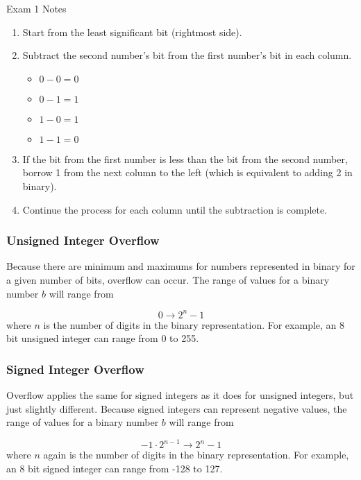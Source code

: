\begin{examnotes}{Exam 1 Notes}
    \begin{enumerate}
        \item Start from the least significant bit (rightmost side).
        \item Subtract the second number's bit from the first number's bit in each column.
        \begin{itemize}
            \item $0 - 0 = 0$
            \item $0 - 1 = 1$ 
            \item $1 - 0 = 1$
            \item $1 - 1 = 0$
        \end{itemize}
        \item If the bit from the first number is less than the bit from the second number, borrow 1 from the next column to the left (which is equivalent to adding 2 in binary).
        \item Continue the process for each column until the subtraction is complete.
    \end{enumerate}

    \subsubsection*{Unsigned Integer Overflow}

    Because there are minimum and maximums for numbers represented in binary for a given number of bits, overflow can occur. The range of values for a binary number $b$ will range from

    \begin{equation*}
        0 \rightarrow 2^{n} - 1
    \end{equation*}
    where $n$ is the number of digits in the binary representation. For example, an 8 bit unsigned integer can range from 0 to 255.

    \subsubsection*{Signed Integer Overflow}

    Overflow applies the same for signed integers as it does for unsigned integers, but just slightly different. Because signed integers can represent negative values, the range of values for a binary
    number $b$ will range from

    \begin{equation*}
        -1 \cdot 2^{n - 1} \rightarrow 2^{n} - 1
    \end{equation*}
    where $n$ again is the number of digits in the binary representation. For example, an 8 bit signed integer can range from -128 to 127.


\end{examnotes}
